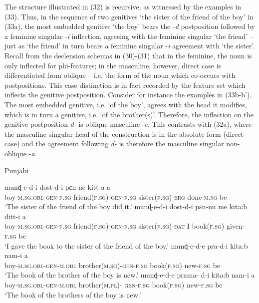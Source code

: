 \documentclass[output=paper]{langsci/langscibook}
\begin{document}
The structure illustrated in (32) is recursive, as witnessed by the examples in (33). Thus, in the sequence of two genitives ‘the sister of the friend of the boy’ in (33a), the most embedded genitive ‘the boy’ bears the -\textit{d} postposition followed by a feminine singular -\textit{i} inflection, agreeing with the feminine singular ‘the friend’ – just as ‘the friend’ in turn bears a feminine singular -\textit{i} agreement with ‘the sister’. Recall from the declension schemas in (30)-(31) that in the feminine, the noun is only inflected for phi-features; in the masculine, however, direct case is differentiated from oblique – i.e. the form of the noun which co-occurs with postpositions. This case distinction is in fact recorded by the feature set which inflects the genitive postposition. Consider for instance the examples in (33b-b’). The most embedded genitive, i.e. ‘of the boy’, agrees with the head it modifies, which is in turn a genitive, i.e. ‘of the brother(s)’. Therefore, the inflection on the genitive postposition \textit{d-} is oblique masculine -\textit{e}. This contrasts with (32a), where the masculine singular head of the construction is in the absolute form (direct case) and the agreement following \textit{d-} is therefore the masculine singular non-oblique -\textit{a}.

\ea%
    Punjabi\label{ex:manzini:33}\\
    \begin{xlista}
    \ex
    \gll     munɖ-e-d-i   dost-d-i   pɛn-ne    kitt-a         a  \\
             boy-\textsc{m.sg.obl-gen-f.sg}  friend\textsc{(f.sg)-gen-f.sg}  sister\textsc{(f.sg)-erg}    done-\textsc{m.sg}   be\\
    \glt     ‘The sister of the friend of the boy did it.’
    \gll    munɖ-e-d-i    dost-d-i   pɛn-nu  me  kita:b         ditt-i   a \\
             boy-\textsc{m.sg.obl-gen-f.sg}  friend\textsc{(f.sg)-gen-f.sg}  sister\textsc{(f.sg)-dat}   I          book\textsc{(f.sg)}   given\textsc{{}-f.sg}   be\\
    \glt     ‘I gave the book to the sister of the friend of the boy.’
    \ex      
    \gll    munɖ-e-d-e   pra-d-i   kita:b   nam-i    a \\
             boy-\textsc{m.sg.obl-gen-m.obl}  brother\textsc{(m.sg)-gen-f.sg}  book\textsc{(f.sg)}   new-\textsc{f.sg} be \\
    \glt     ‘The book of the brother of the boy is new.’
    \gll     munɖ-e-d-e   prama-  d-i   kita:b   nam-i       a\\
             boy-\textsc{m.sg.obl-gen-m.obl}  brother\textsc{(m.pl)-}  \textsc{gen-f.sg}   book\textsc{(f.sg)}   new-\textsc{f.sg} be \\
    \glt     ‘The book of the brothers of the boy is new.’
    \end{xlista}
    \z
    
\end{document}
